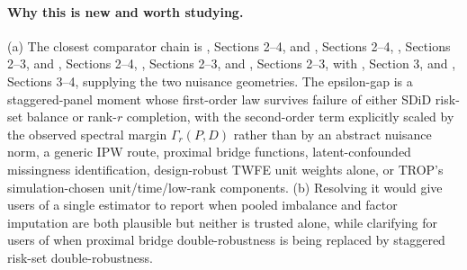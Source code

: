 \documentclass[11pt]{article}
\theoremstyle{definition}
\theoremstyle{plain}
\theoremstyle{remark}
\begin{document}
\paragraph{Why this is new and worth studying.}
(a) The closest comparator chain is
\citet{ArkhangelskyImbens2022}, Sections 2--4, and
\citet{ArkhangelskyImbensLeiLuo2024}, Sections 2--4,
\citet{AbadieAgarwalDwivediShah2024}, Sections 2--3, and
\citet{QiuShiMiaoDobribanTchetgenTchetgen2024}, Sections 2--4,
\citet{AgarwalDahlehShahShen2023}, Sections 2--3, and
\citet{AtheyImbensQuViviano2025}, Sections 2--3, with
\citet{ArkhangelskyAtheyHirshbergImbensWager2021}, Section 3, and
\citet{AtheyBayatiDoudchenkoImbensKhosravi2021}, Sections 3--4, supplying the
two nuisance geometries. The epsilon-gap is a staggered-panel moment whose
first-order law survives failure of either SDiD risk-set balance or rank-$r$
completion, with the second-order term explicitly scaled by the observed
spectral margin $\Gamma_r(P,D)$ rather than by an abstract nuisance norm, a
generic IPW route, proximal bridge functions, latent-confounded missingness
identification, design-robust TWFE unit weights alone, or TROP's
simulation-chosen unit/time/low-rank components. (b) Resolving it would give
users of \citet{BenMichaelFellerRothstein2022} a single estimator to report
when pooled imbalance and factor imputation are both plausible but neither is
trusted alone, while clarifying for users of
\citet{QiuShiMiaoDobribanTchetgenTchetgen2024} when proximal bridge
double-robustness is being replaced by staggered risk-set double-robustness.
\end{document}
